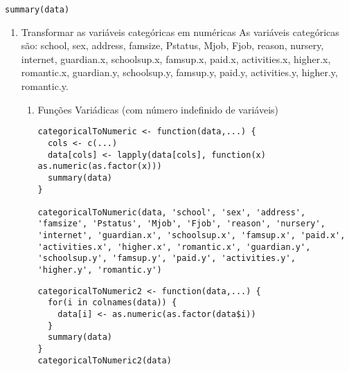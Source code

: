 \documentclass[11pt]{article}
\begin{document}
\begin{verbatim}
summary(data)
\end{verbatim}
\begin{enumerate}
\item Transformar as variáveis categóricas em numéricas
\label{sec:org66dbb17}
As variáveis categóricas são: school, sex, address, famsize, Pstatus, Mjob, Fjob, reason, nursery, internet, guardian.x, schoolsup.x, famsup.x, paid.x, activities.x, higher.x, romantic.x, guardian.y, schoolsup.y, famsup.y, paid.y, activities.y, higher.y, romantic.y.

\begin{enumerate}
\item Funções Variádicas (com número indefinido de variáveis)
\label{sec:org2f86100}
\begin{verbatim}
categoricalToNumeric <- function(data,...) {
  cols <- c(...)
  data[cols] <- lapply(data[cols], function(x) as.numeric(as.factor(x)))
  summary(data)
}

categoricalToNumeric(data, 'school', 'sex', 'address', 'famsize', 'Pstatus', 'Mjob', 'Fjob', 'reason', 'nursery', 'internet', 'guardian.x', 'schoolsup.x', 'famsup.x', 'paid.x', 'activities.x', 'higher.x', 'romantic.x', 'guardian.y', 'schoolsup.y', 'famsup.y', 'paid.y', 'activities.y', 'higher.y', 'romantic.y')
\end{verbatim}

\begin{verbatim}
categoricalToNumeric2 <- function(data,...) {
  for(i in colnames(data)) {
    data[i] <- as.numeric(as.factor(data$i))
  }
  summary(data)
}
categoricalToNumeric2(data)
\end{verbatim}
\end{enumerate}
\end{enumerate}
\end{document}
